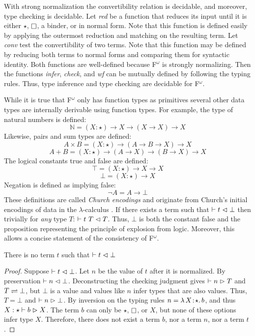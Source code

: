 With strong normalization the convertibility relation is decidable, and moreover, type checking is decidable.
Let \textit{red} be a function that reduces its input until it is either $\star$, $\kind$, a binder, or in normal form.
Note that this function is defined easily by applying the outermost reduction and matching on the resulting term.
Let \textit{conv} test the convertibility of two terms.
Note that this function may be defined by reducing both terms to normal forms and comparing them for syntactic identity.
Both functions are well-defined because F$^\omega$ is strongly normalizing.
Then the functions \textit{infer}, \textit{check}, and \textit{wf} can be mutually defined by following the typing rules.
Thus, type inference and type checking are decidable for F$^\omega$.

While it is true that F$^\omega$ only has function types as primitives several other data types are internally derivable using function types.
For example, the type of natural numbers is defined:
$$\mathbb{N} = (X : \star) \to X \to (X \to X) \to X$$
Likewise, pairs and sum types are defined:
$$A \times B = (X : \star) \to (A \to B \to X) \to X$$
$$A + B = (X : \star) \to (A \to X) \to (B \to X) \to X$$
The logical constants true and false are defined:
$$\top = (X : \star) \to X \to X$$
$$\bot = (X : \star) \to X$$
Negation is defined as implying false:
$$\neg A = A \to \bot$$
These definitions are called \textit{Church encodings} and originate from Church's initial encodings of data in the $\lambda$-calculus \cite{church1932,church1933}.
If there exists a term such that $\vdash t \vartriangleleft \bot$ then trivially for \textit{any} type $T$: $\vdash t\ T \vartriangleleft T$.
Thus, $\bot$ is both the constant false and the proposition representing the principle of explosion from logic.
Moreover, this allows a concise statement of the consistency of F$^\omega$.

\begin{theorem}
    There is no term $t$ such that $\vdash t \vartriangleleft \bot$
\end{theorem}
\begin{proof}
    Suppose $\vdash t \vartriangleleft \bot$.
    Let $n$ be the value of $t$ after it is normalized.
    By preservation $\vdash n \vartriangleleft \bot$.
    Deconstructing the checking judgment gives $\vdash n \vartriangleright T$ and $T \rightleftharpoons \bot$, but $\bot$ is a value and values like $n$ infer types that are also values.
    Thus, $T = \bot$ and $\vdash n \vartriangleright \bot$.
    By inversion on the typing rules $n = {\lambda}\, X\! : \! \star.\, b$, and thus $X : \star \vdash b \vartriangleright X$.
    The term $b$ can only be $\star$, $\kind$, or $X$, but none of these options infer type $X$.
    Therefore, there does not exist a term $b$, nor a term $n$, nor a term $t$.
\end{proof}

